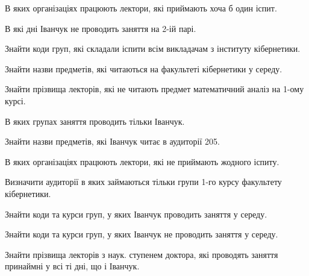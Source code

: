 \begin{card}
    \item В яких організаціях працюють лектори, які приймають хоча б один іспит.
    \item В які дні  Іванчук не проводить заняття на 2-ій парі.
    \item Знайти коди груп, які складали іспити всім викладачам з інституту кібернетики.
\end{card}

\begin{card}
    \item Знайти назви предметів, які читаються на факультеті кібернетики у середу.
    \item Знайти прізвища лекторів, які не читають предмет математичний аналіз на 1-ому курсі.
    \item В яких групах заняття проводить тільки Іванчук.
\end{card}

\begin{card}
    \item Знайти назви предметів, які Іванчук читає в аудиторії 205.
    \item В яких організаціях працюють лектори, які не приймають жодного іспиту.
    \item Визначити аудиторії в яких займаються тільки групи 1-го курсу факультету кібернетики.
\end{card}

\begin{card}
    \item Знайти коди та курси груп, у яких Іванчук проводить заняття у середу.
    \item Знайти коди та курси груп, у яких Іванчук не проводить заняття у середу.
    \item Знайти прізвища лекторів з наук. ступенем доктора, які проводять заняття принаймні у всі ті дні, що і Іванчук.
\end{card}
